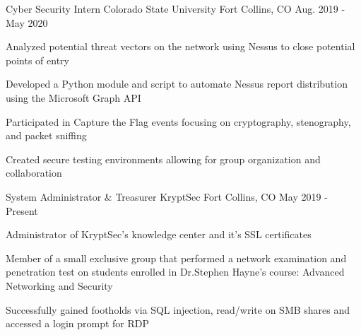 \vspace{-5.0mm}


\begin{cventries}

  \cventry
    {Cyber Security Intern} %
    {Colorado State University} %
    {Fort Collins, CO} %
    {Aug. 2019 - May 2020} %
    {
      \begin{cvitems} %
        \item {Analyzed potential threat vectors on the network using Nessus to close potential points of entry}
        \item {Developed a Python module and script to automate Nessus report distribution using the Microsoft Graph API}
        \item {Participated in Capture the Flag events focusing on cryptography, stenography, and packet sniffing}
        \item {Created secure testing environments allowing for group organization and collaboration}
      \end{cvitems}
    }

  \cventry
    {System Administrator \& Treasurer} %
    {KryptSec} %
    {Fort Collins, CO} %
    {May 2019 - Present} %
    {
      \begin{cvitems} %
        \item {Administrator of KryptSec’s knowledge center and it’s SSL certificates}
        \item {Member of a small exclusive group that performed a network examination and penetration test on students enrolled in Dr.Stephen Hayne’s course: Advanced Networking and Security}
        \item {Successfully gained footholds via SQL injection, read/write on SMB shares and accessed a login prompt for RDP}
      \end{cvitems}
    }


\end{cventries}

